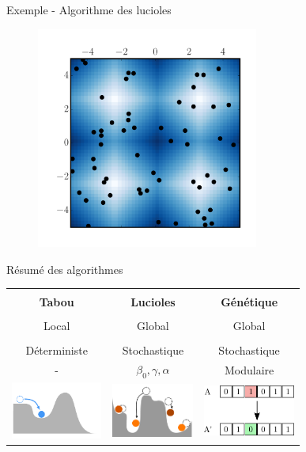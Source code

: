 \documentclass{beamer}
\begin{document}
\begin{frame}{Exemple - Algorithme des lucioles}
\begin{figure}[h!]
    \centering
    \href{run:figures/lines.mp4}{\includegraphics[width=0.65\textwidth]{figures/fireflyout1.pdf}}
  \end{figure}
\end{frame}



\begin{frame}{Résumé des algorithmes}
\begin{table}[h!]
  \centering
  \begin{tabular}{ccc}
  \hline\\
  \textbf{Tabou} & \textbf{Lucioles} & \textbf{Génétique}\\
  \hline\\

  Local & Global & Global\\\\
  Déterministe & Stochastique & Stochastique\\
    - & $\beta_0,\gamma,\alpha$ & Modulaire \\
  \includegraphics[width=3cm]{figures/tabou2v2.pdf}& \includegraphics[width=2.7cm]{figures/firefly2_v2.pdf} & \includegraphics[width=3cm]{figures/mutation2.pdf} \\
  \hline
  \end{tabular}
\end{table}
  
\end{frame} 
\end{document}
